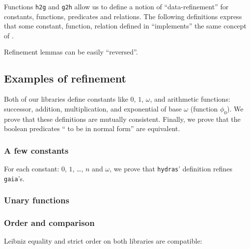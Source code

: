 Functions \texttt{h2g} and \texttt{g2h} allow us to define
a notion of ``data-refinement''  for constants, functions, predicates and relations. The following definitions express that some
constant, function, relation defined in \HydrasLib ``implements'' the same concept of \gaia.









Refinement lemmas can be easily ``reversed''.


\subsection{Examples of refinement}
Both of our libraries define constants like $0$, $1$, $\omega$, and arithmetic functions: successor, addition, multiplication, and exponential of base $\omega$ (function $\phi_0$). We prove that these definitions are mutually consistent. Finally, we prove that the boolean predicates `` to be in normal form'' are equivalent.

\subsubsection{A few constants}
For each constant: $0$, $1$, \dots, $n$ and $\omega$, we prove
that \texttt{hydras}' definition refines \texttt{gaia}'s.


\subsubsection{Unary functions}


\subsubsection{Order and comparison}
\label{sect:lt-compat-gaia}
Leibniz equality and strict order on both libraries are
compatible:



\label{sect:gaia-compare-ref}


